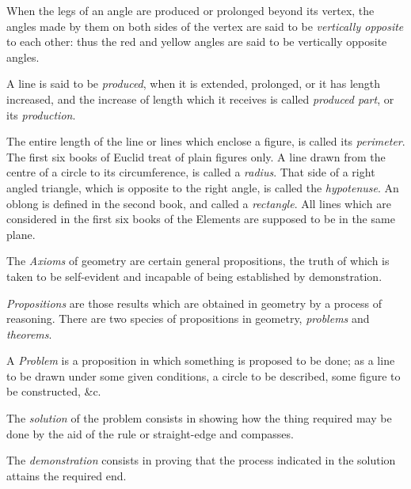 \documentclass{byrnebook}
\begin{document}
When the legs of an angle are produced or prolonged beyond its vertex, the angles made by them on both sides of the vertex are said to be \emph{vertically opposite} to each other: thus the red and yellow angles are said to be vertically opposite angles.


A line is said to be \emph{produced}, when it is extended, prolonged, or it has length increased, and the increase of length which it receives is called \emph{produced part}, or its \emph{production}.

The entire length of the line or lines which enclose a figure, is called its \emph{perimeter}. The first six books of Euclid treat of plain figures only. A line drawn from the centre of a circle to its circumference, is called a \emph{radius}. That side of a right angled triangle, which is opposite to the right angle, is called the \emph{hypotenuse}. An oblong is defined in the second book, and called a \emph{rectangle}. All lines which are considered in the first six books of the Elements are supposed to be in the same plane.


The \emph{Axioms} of geometry are certain general propositions, the truth of which is taken to be self-evident and incapable of being established by demonstration.

\emph{Propositions} are those results which are obtained in geometry by a process of reasoning. There are two species of propositions in geometry, \emph{problems} and \emph{theorems}.

A \emph{Problem} is a proposition in which something is proposed to be done; as a line to be drawn under some given conditions, a circle to be described, some figure to be constructed, \&c.

The \emph{solution} of the problem consists in showing how the thing required may be done by the aid of the rule or straight-edge and compasses.

The \emph{demonstration} consists in proving that the process indicated in the solution attains the required end.
\end{document}

